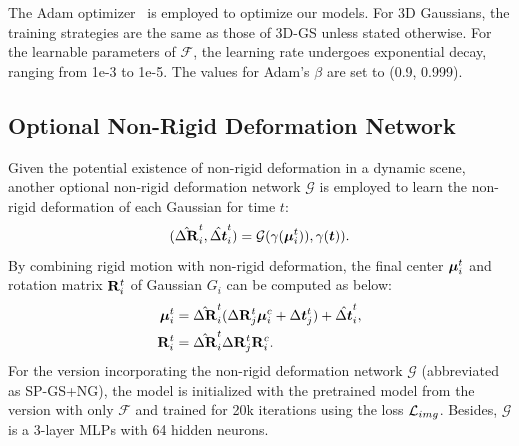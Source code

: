 The Adam optimizer~\cite{Adam} is employed to optimize our models. For 3D Gaussians, the training strategies are the same as those of 3D-GS unless stated otherwise. For the learnable parameters of $\mathcal{F}$, the learning rate undergoes exponential decay, ranging from 1e-3 to 1e-5. The values for Adam's $\beta$ are set to (0.9, 0.999).

\subsection{Optional Non-Rigid Deformation Network}\label{sec:non-rigid}
Given the potential existence of non-rigid deformation in a dynamic scene, another optional non-rigid deformation network $\mathcal{G}$ is employed to learn the non-rigid deformation of each Gaussian for time $t$:
\begin{equation}
    (\hat{\Delta\mathbf{R}}_i^t, \hat{\Delta\bm{t}}_i^t) = \mathcal{G}(\gamma(\bm{\mu}_i^t)), \gamma(\bm{t})).
\end{equation}
By combining rigid motion with non-rigid deformation, the final center $\bm{\mu}^t_i$ and rotation matrix $\mathbf{R}^t_i$ of Gaussian $G_i$ can be computed as below:
\begin{equation}
    \begin{split}
        \bm{\mu}_i^t & = \hat{\Delta\mathbf{R}}_i^t (\Delta\mathbf{R}_j^t \bm{\mu}^c_i + \Delta\bm{t}_j^t) + \hat{\Delta\bm{t}}_i^t, \\
        \mathbf{R}_i^t & = \hat{\Delta\mathbf{R}}_i^t \Delta\mathbf{R}_j^t \mathbf{R}^c_i.
    \end{split}
\end{equation}
For the version incorporating the non-rigid deformation network $\mathcal{G}$ (abbreviated as SP-GS+NG), the model is initialized with the pretrained model from the version with only $\mathcal{F}$ and trained for 20k iterations using the loss $\mathcal{L}_{img}$. Besides, $\mathcal{G}$ is a 3-layer MLPs with 64 hidden neurons.